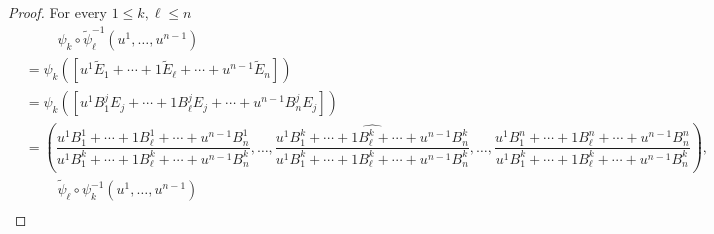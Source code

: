 \begin{proof}
    For every \( 1 \le k, \ell \le n \)
    \begingroup
    \allowdisplaybreaks%
    \scriptsize
    \begin{align*}
         & \phantom{=\quad} \psi_{k} \circ \widetilde{\psi}_{\ell}^{-1}(u^{1}, \ldots, u^{n-1})                                                                                                                                                                                                                                                                                                                                                                                                                               \\
         & = \psi_{k}([u^{1}\widetilde{E}_{1} + \cdots + 1\widetilde{E}_{\ell} + \cdots + u^{n-1}\widetilde{E}_{n}])                                                                                                                                                                                                                                                                                                                                                                                                          \\
         & = \psi_{k}([u^{1} B_{1}^{j}E_{j} + \cdots + 1 B_{\ell}^{j}E_{j} + \cdots + u^{n-1} B_{n}^{j}E_{j}])                                                                                                                                                                                                                                                                                                                                                                                                                \\
         & = \left( \dfrac{u^{1} B_{1}^{1} + \cdots + 1 B_{\ell}^{1} + \cdots + u^{n-1} B_{n}^{1}}{u^{1} B_{1}^{k} + \cdots + 1 B_{\ell}^{k} + \cdots + u^{n-1} B_{n}^{k}}, \ldots, \widehat{\dfrac{u^{1} B_{1}^{k} + \cdots + 1 B_{\ell}^{k} + \cdots + u^{n-1} B_{n}^{k}}{u^{1} B_{1}^{k} + \cdots + 1 B_{\ell}^{k} + \cdots + u^{n-1} B_{n}^{k}}}, \ldots, \dfrac{u^{1} B_{1}^{n} + \cdots + 1 B_{\ell}^{n} + \cdots + u^{n-1} B_{n}^{n}}{u^{1} B_{1}^{k} + \cdots + 1 B_{\ell}^{k} + \cdots + u^{n-1} B_{n}^{k}} \right), \\
         & \phantom{=\quad} \widetilde{\psi}_{\ell} \circ \psi_{k}^{-1}(u^{1}, \ldots, u^{n-1})                                                                                                                                                                                                                                                                                                                                                                                                                               \\

\end{align*}
\end{proof}
